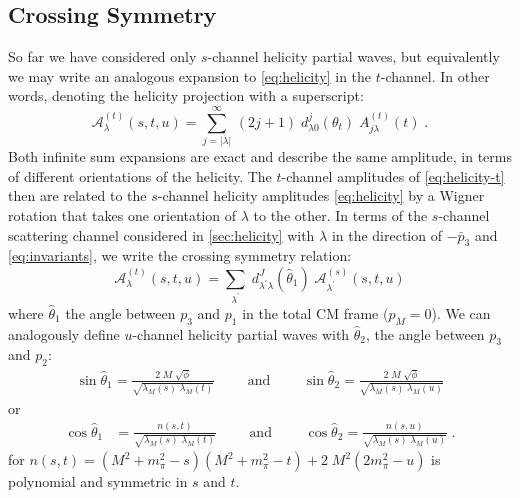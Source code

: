 \documentclass[10pt, aps,prd,amsmath,amssymb,superscriptaddress,onecolumn,
nofootinbib,showpacs,preprintnumbers]{revtex4-1}
\newcommand{\mand}{\qquad \text{ and } \qquad}
\begin{document}
\subsection{Crossing Symmetry}
 So far we have considered only \(s\)-channel helicity partial waves, but equivalently we may write an analogous expansion to \cref{eq:helicity} in the \(t\)-channel. In other words, denoting the helicity projection with a superscript:
 \begin{equation}
   \label{eq:helicity-t}
   \mathcal{A}^{(t)}_\lambda(s, t, u) = \sum_{j = |\lambda|}^\infty \, (2j+1) \; d^{j}_{\lambda0}(\theta_t) \; A^{(t)}_{j\lambda}(t) \; .
 \end{equation}
Both infinite sum expansions are exact and describe the same amplitude, in terms of different orientations of the helicity. The \(t\)-channel amplitudes of \cref{eq:helicity-t} then are related to the \(s\)-channel helicity amplitudes \cref{eq:helicity} by a Wigner rotation that takes one orientation of \(\lambda\) to the other.
In terms of the \(s\)-channel scattering channel considered in \cref{sec:helicity} with \(\lambda\) in the direction of \(-\bar{p}_3\) and \cref{eq:invariants}, we write the crossing symmetry relation:
  \begin{equation}
    \label{eq:crossing-relation}
    \mathcal{A}_\lambda^{(t)}(s, t, u) = \sum_{\lambda^\prime} \; d_{\lambda^\prime \lambda}^J(\hat{\theta}_1) \; \mathcal{A}_{\lambda^\prime}^{(s)}(s,t,u)
  \end{equation}
where \(\hat{\theta}_1\) the angle between \(p_3\) and \(p_1\) in the total CM frame \((p_M = 0\)). We can analogously define \(u\)-channel helicity partial waves with \(\hat{\theta}_2\), the angle between \(p_3\) and \(p_2\):
  \begin{align} \label{sin-hat}
    \sin\hat{\theta}_1 = \frac{
    2 \; M \; \sqrt{\phi}
    }{
    \sqrt{\lambda_M(s) \;  \lambda_M(t)}
    }
    \mand
    \sin\hat{\theta}_2 = \frac{
    2 \; M \; \sqrt{\phi}
    }{
    \sqrt{\lambda_M(s) \;  \lambda_M(u)}
    }
  \end{align}
or
  \begin{align} \label{cos-hat}
    \cos\hat{\theta}_1 &= \frac{n(s,t)}
    {\sqrt{\lambda_M(s) \; \lambda_M(t)}} \mand
    \cos\hat{\theta}_2 = \frac{n(s,u)}
    {\sqrt{\lambda_M(s) \; \lambda_M(u)}} \; .
  \end{align}
for \(n(s,t) = (M^2 + m_\pi^2 - s)(M^2 + m_\pi^2 - t) + 2 \; M^2 (2m_\pi^2 - u)\) is polynomial and symmetric in \(s\) and \(t\).
\end{document}
